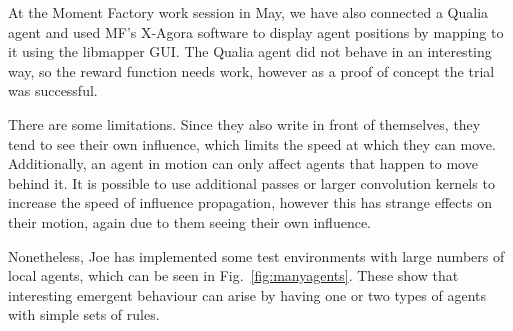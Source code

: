 \documentclass{article}
\begin{document}
At the Moment Factory work session in May, we have also connected a
Qualia agent and used MF's X-Agora software to display agent positions
by mapping to it using the libmapper GUI.
The Qualia agent did not behave in an interesting way, so the reward
function needs work, however as a proof of concept the trial was
successful.

There are some limitations.
Since they also write in front of themselves, they tend to see their
own influence, which limits the speed at which they can move.
Additionally, an agent in motion can only affect agents that happen to
move behind it.
It is possible to use additional passes or larger convolution kernels
to increase the speed of influence propagation, however this has
strange effects on their motion, again due to them seeing their own
influence.

Nonetheless, Joe has implemented some test environments with large
numbers of local agents, which can be seen in
Fig.~\ref{fig:manyagents}.
These show that interesting emergent behaviour can arise by having one
or two types of agents with simple sets of rules.
\end{document}
